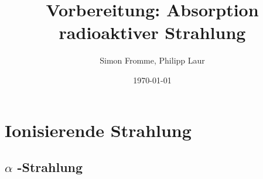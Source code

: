\documentclass{scrartcl}
\title{Vorbereitung: Absorption radioaktiver Strahlung}
\author{Simon Fromme, Philipp Laur}
\date{\today}
\begin{document}
\section{Ionisierende Strahlung}
\label{sec:ionis-strahl}

\subsection{$\alpha$ -Strahlung}
\label{sec:alpha-strahlung}



\maketitle
\end{document}
